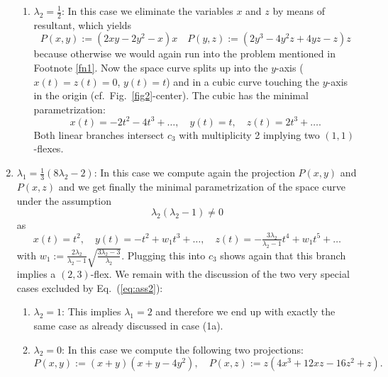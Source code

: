 \documentclass{svproc}
\begin{document}
\begin{enumerate}
\begin{enumerate}
        \item 
        $\lambda_2=\tfrac{1}{2}$: In this case we eliminate the variables $x$ and $z$ by means of resultant, which yields
        \begin{equation}
            P(x,y):=(2xy - 2y^2 - x)x \quad
            P(y,z):=(2y^3 - 4y^2z + 4yz - z)z
        \end{equation}
        because otherwise we would again run into the problem mentioned in Footnote \ref{fn1}. Now the space curve splits up into the $y$-axis ($x(t)=z(t)=0$, $y(t)=t$) and in a cubic curve touching the $y$-axis in the origin (cf.\ Fig.\ \ref{fig2}-center). The cubic has the minimal parametrization:
        \begin{equation}
         x(t)=-2t^2-4t^3+\ldots , \quad y(t)=t, \quad 
         z(t)=2t^3 +\ldots .
        \end{equation}
        Both linear branches intersect $c_3$ with multiplicity 2 implying two $(1,1)$-flexes. 
    \end{enumerate}
    \item
    $\lambda_1=\frac{1}{3}(8\lambda_2-2)$: In this case we compute again the projection $P(x,y)$ and $P(x,z)$ and we get finally the minimal parametrization of the space curve under the assumption
    \begin{equation}\label{eq:ass2}
        \lambda_2(\lambda_2-1)\neq 0
    \end{equation}
    as
    \begin{equation}
    x(t)=t^2, \quad 
    y(t)=-t^2+
    w_1t^3+\ldots ,\quad
    z(t)=-\tfrac{3\lambda_2}{\lambda_2 - 1}t^4+w_1t^5+\ldots 
    \end{equation}
    with
    $w_1:=\tfrac{2\lambda_2}{\lambda_2 - 1}\sqrt{\tfrac{3\lambda_2 - 3}{\lambda_2}}$. 
    Plugging this into $c_3$ shows again that this branch implies a $(2,3)$-flex. We remain with the discussion of the two very special cases excluded by Eq.\ (\ref{eq:ass2}):
    \begin{enumerate}
        \item 
        $\lambda_2=1$: This implies $\lambda_1=2$ and therefore we end up with exactly the same case as already discussed in case (1a). 
        \item 
        $\lambda_2=0$: In this case we compute the following two  projections: 
        \begin{equation}
            P(x,y):=(x + y)( x + y - 4y^2), \quad
            P(x,z):=z(4x^3 + 12xz - 16z^2 + z). 
        \end{equation}

\end{enumerate}
\end{enumerate}
\end{document}
